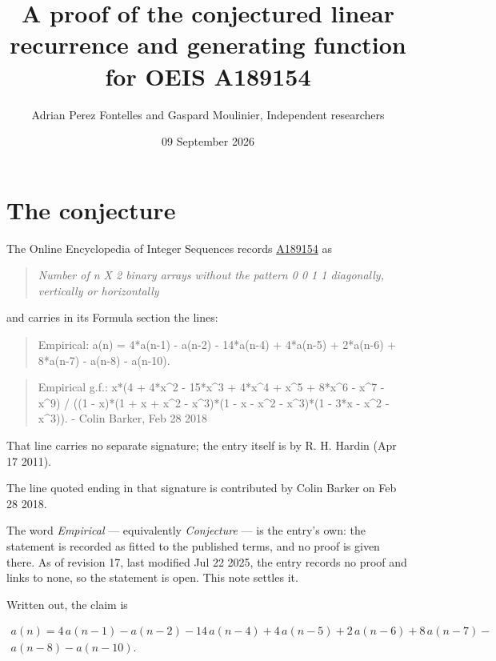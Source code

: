 \documentclass[11pt]{article}
\title{A proof of the conjectured linear recurrence and generating function for OEIS A189154}
\author{Adrian Perez Fontelles and Gaspard Moulinier, Independent researchers}
\date{09 September 2026}
\theoremstyle{definition}
\begin{document}
\maketitle
\section{The conjecture}

The Online Encyclopedia of Integer Sequences records \href{https://oeis.org/A189154}{A189154} as

\begin{quote}\itshape Number of n X 2 binary arrays without the pattern 0 0 1 1 diagonally, vertically or horizontally\end{quote}

and carries in its Formula section the lines:

\begin{quote}\ttfamily Empirical: a(n) = 4*a(n-1) - a(n-2) - 14*a(n-4) + 4*a(n-5) + 2*a(n-6) + 8*a(n-7) - a(n-8) - a(n-10).\end{quote}

\begin{quote}\ttfamily Empirical g.f.: x*(4 + 4*x\textasciicircum{}2 - 15*x\textasciicircum{}3 + 4*x\textasciicircum{}4 + x\textasciicircum{}5 + 8*x\textasciicircum{}6 - x\textasciicircum{}7 - x\textasciicircum{}9) / ((1 - x)*(1 + x + x\textasciicircum{}2 - x\textasciicircum{}3)*(1 - x - x\textasciicircum{}2 - x\textasciicircum{}3)*(1 - 3*x - x\textasciicircum{}2 - x\textasciicircum{}3)). - Colin Barker, Feb 28 2018\end{quote}

That line carries no separate signature; the entry itself is by R. H. Hardin (Apr 17 2011).

The line quoted ending in that signature is contributed by Colin Barker on Feb 28 2018.

The word {\itshape Empirical} --- equivalently {\itshape Conjecture} --- is the entry's own: the statement is recorded as fitted to the published terms, and no proof is given there. As of revision 17, last modified Jul 22 2025, the entry records no proof and links to none, so the statement is open. This note settles it.

Written out, the claim is

\begin{multline*} a(n) = 4\,a(n-1) - a(n-2) - 14\,a(n-4) + 4\,a(n-5) + 2\,a(n-6) + 8\,a(n-7) - \\ a(n-8) - a(n-10). \end{multline*}
\end{document}
